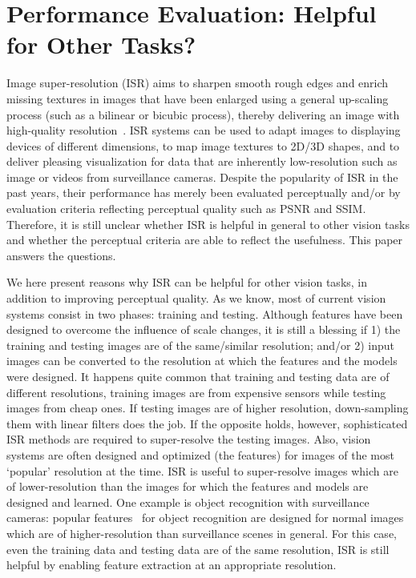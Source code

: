 \chapter{Performance Evaluation: Helpful for Other Tasks?}
\label{ch:SR4VT}
Image super-resolution (ISR) aims to sharpen smooth rough edges and
enrich missing textures in images that have been enlarged using a
general up-scaling process (such as a bilinear or bicubic process),
thereby delivering an image with high-quality
resolution~\cite{Freeman-CGA-2002, Yang-TIP-2010, Zeyde-CS-2012,
  Timofte-ICCV-2013, Dong-ECCV-2014, JOR:EG15}. ISR systems can be
used to adapt images to displaying devices of different dimensions, to
map image textures to 2D/3D shapes, and to deliver pleasing
visualization for data that are inherently low-resolution such as
image or videos from surveillance cameras.  Despite the popularity of
ISR in the past years, their performance has merely been evaluated
perceptually and/or by evaluation criteria reflecting perceptual
quality such as PSNR and SSIM. Therefore, it is still unclear whether
ISR is helpful in general to other vision tasks and whether the
perceptual criteria are able to reflect the usefulness. 
This paper answers the questions.

We here present reasons why ISR can be helpful for other vision tasks,
in addition to improving perceptual quality. As we know, most of
current vision systems consist in two phases: training and
testing. Although features have been designed to overcome the
influence of scale changes, it is still a blessing if 1) the training
and testing images are of the same/similar resolution; and/or 2)
input images can be converted to the resolution at which the
features and the models were designed. It happens quite common that
training and testing data are of different resolutions, \eg training
images are from expensive sensors while testing images from cheap
ones. If testing images are of higher resolution, down-sampling them
with linear filters does the job. If the opposite holds, however,
sophisticated ISR methods are required to super-resolve the testing
images. Also, vision systems are often designed and optimized (\eg the
features) for images of the most `popular' resolution at the time. ISR
is useful to super-resolve images which are of lower-resolution than
the images for which the features and models are designed and
learned. One example is object recognition with surveillance cameras:
popular features~\cite{Lowe_SIFT, Dalal_HoG, cnnfeatureoffshelf} for object recognition are designed for normal images
which are of higher-resolution than surveillance scenes in
general. For this case, even the training data and testing data
are of the same resolution, ISR is still helpful by
enabling feature extraction at an appropriate resolution.


